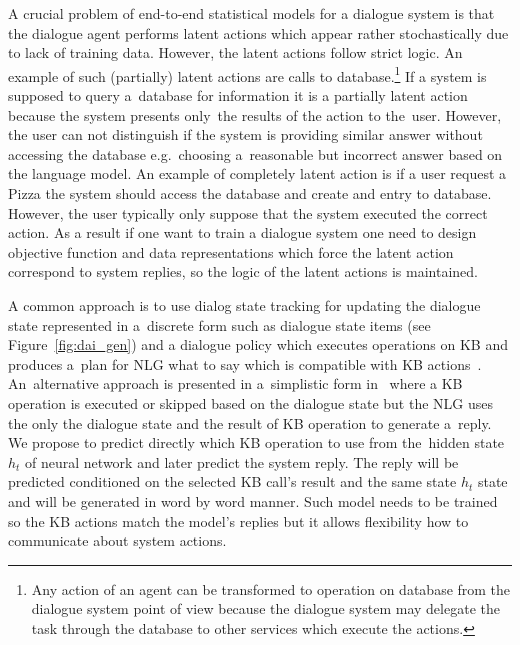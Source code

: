 \documentclass[11pt]{article}
\begin{document}
A crucial problem of end-to-end statistical models for a dialogue system is that the dialogue agent performs latent actions which appear rather stochastically due to lack of training data.
However, the latent actions follow strict logic.
An example of such (partially) latent actions are calls to database.\footnote{Any action of an agent can be transformed to operation on database from the dialogue system point of view because the dialogue system may delegate the task through the database to other services which execute the actions.}
If a system is supposed to query a~database for information it is a partially latent action because the system presents only~the results of the action to the~user.
However, the user can not distinguish if the system is providing similar answer without accessing the database e.g.~choosing a~reasonable but incorrect answer based on the language model.
An example of completely latent action is if a user request a Pizza the system should access the database and create and entry to database.
However, the user typically only suppose that the system executed the correct action.
As a result if one want to train a dialogue system one need to design objective function and data representations which force the latent action correspond to system replies, so the logic of the latent actions is maintained.

A common approach is to use dialog state tracking for updating the dialogue state represented in a~discrete form such as dialogue state items (see Figure~\ref{fig:dai_gen}) and a dialogue policy which executes operations on KB and produces a~plan for NLG what to say which is compatible with KB actions~\cite{dusek_sequence2sequence_2016,young2010hidden}.
An~alternative approach is presented in a~simplistic form in~\cite{wen_networkbased_2016} where a KB operation is executed or skipped based on the dialogue state but the NLG uses the only the dialogue state and the result of KB operation to generate a~reply.
We propose to predict directly which KB operation to use from the~hidden state $h_t$ of neural network and later predict the system reply.
The reply will be predicted conditioned on the selected KB call's result and the same state $h_t$ state and will be generated in word by word manner.
Such model needs to be trained so the KB actions match the model's replies but it allows flexibility how to communicate about system actions.
\end{document}
